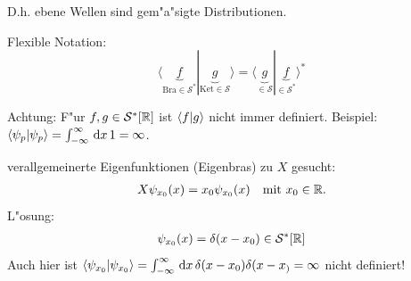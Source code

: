\documentclass[a4paper]{scrartcl}
\newcommand{\RR}{\ensuremath \mathbb{R}}
\newcommand{\dd}{\ensuremath \, \mathrm{d}}
\begin{document}
{D.h. ebene Wellen sind gem"a"sigte Distributionen.

Flexible Notation:
$$\langle \underbrace{f}_{\mathrm{Bra}\in \mathcal S^*}  | \underbrace{g}_{\mathrm{Ket}\in\mathcal S} \rangle = \langle \underbrace{g}_{\in \mathcal S} | \underbrace{f}_{\in \mathcal S^*} \rangle^*$$

Achtung: F"ur $f,g \in \mathcal S^*[\RR]$ ist $\braket{ f|g}$ nicht immer definiert. Beispiel: $\braket{ \psi_p | \psi_p}  = \int_{-\infty}^\infty \dd x \, 1 = \infty$.

verallgemeinerte Eigenfunktionen (Eigenbras) zu $X$ gesucht:
\begin{align}X \psi_{x_0}(x) = x_0 \psi_{x_0}(x) \quad \mathrm{ mit \ } x_0 \in \RR.
\end{align}
L"osung:
\begin{align}
\psi_{x_0}(x) = \delta(x -x_0) \in \mathcal S^*[\RR]
\end{align}
Auch hier ist $\braket{ \psi_{x_0} | \psi_{x_0}} = \int_{-\infty}^\infty \dd x \, \delta(x-x_0) \delta(x-x_) = \infty$ nicht definiert!

}
\end{document}
